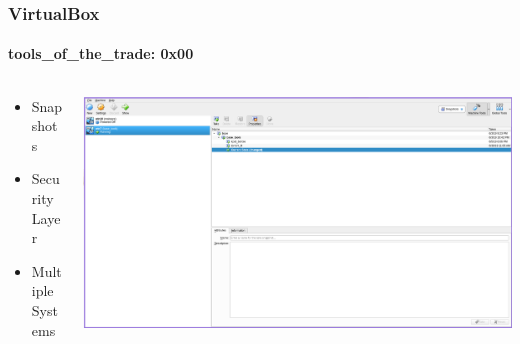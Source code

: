 \documentclass[aspectratio=169]{beamer}
\begin{document}
\begin{frame}
  \frametitle{VirtualBox}
  \framesubtitle{tools\_of\_the\_trade: 0x00}
  \begin{columns}
    \begin{column}{.3\textwidth}
      \begin{itemize}
      \item{Snapshots}
      \item{Security Layer}
      \item{Multiple Systems}
      \end{itemize}
    \end{column}
    \hfill
    \begin{column}{.7\textwidth}
      \includegraphics[scale=0.6]{virtualbox}
    \end{column}
  \end{columns}
\end{frame}
\end{document}
